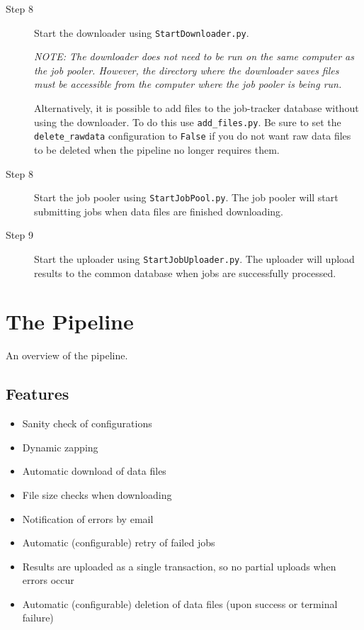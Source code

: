 \begin{description}
    \item[Step 8] Start the downloader using \texttt{StartDownloader.py}.
        
        \smallskip
        
        \textit{NOTE: The downloader does not need to be run on the same computer as the job pooler. However, the directory where the downloader saves files must be accessible from the computer where the job pooler is being run.}
        
        \smallskip
        
        Alternatively, it is possible to add files to the job-tracker database without using the downloader. To do this use \texttt{add\_files.py}. Be sure to set the \texttt{delete\_rawdata} configuration to \texttt{False} if you do not want raw data files to be deleted when the pipeline no longer requires them. 

    \item[Step 8] Start the job pooler using \texttt{StartJobPool.py}. The job pooler will start submitting jobs when data files are finished downloading. 

    \item[Step 9] Start the uploader using \texttt{StartJobUploader.py}. The uploader will upload results to the common database when jobs are successfully processed.
\end{description}


\section{The Pipeline}
An overview of the pipeline.

\subsection{Features}
\begin{itemize}
    \item Sanity check of configurations
    \item Dynamic zapping
    \item Automatic download of data files
    \item File size checks when downloading
    \item Notification of errors by email
    \item Automatic (configurable) retry of failed jobs
    \item Results are uploaded as a single transaction, so no partial uploads when errors occur
    \item Automatic (configurable) deletion of data files (upon success or terminal failure)
\end{itemize}


